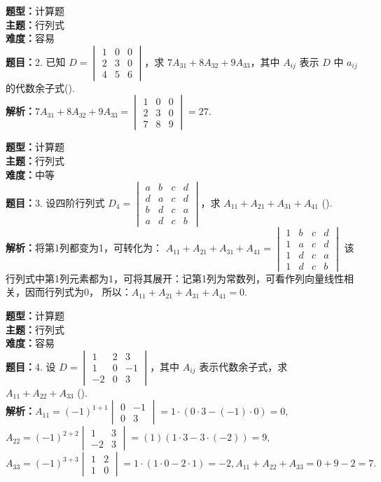 \documentclass{ctexart}
\newenvironment{question}[5]{%
	\noindent\textbf{题型：}#1\\
	\textbf{主题：}#2\\
	\textbf{难度：}#3\\
	\textbf{题目：}#4\\
	\textbf{解析：}#5\\
	\vspace{1em}
}{}
\begin{document}
	
	\begin{question}
		{计算题}
		{行列式}
		{容易}
		{2. 已知 \(D=\begin{vmatrix}1 & 0 & 0 \\ 2 & 3 & 0 \\ 4 & 5 & 6\end{vmatrix}\)，求 \(7 A_{31} + 8 A_{32} + 9 A_{33}\)，其中 \(A_{ij}\) 表示 \(D\) 中 \(a_{ij}\) 的代数余子式(\qquad). }
		{\(7 A_{31} + 8 A_{32} + 9 A_{33} = \begin{vmatrix}1 & 0 & 0 \\ 2 & 3 & 0 \\ 7 & 8 & 9\end{vmatrix} = 27\). }
	\end{question}
	
	
	\begin{question}
		{计算题}
		{行列式}
		{中等}
		{3. 设四阶行列式 \(D_4=\begin{vmatrix}a & b & c & d \\ d & a & c & d \\ b & d & c & a \\ a & d & c & b\end{vmatrix}\)，求 \(A_{11} + A_{21} + A_{31} + A_{41}\) (\qquad). }
		{将第1列都变为1，可转化为：
			\(
			A_{11} + A_{21} + A_{31} + A_{41} = \begin{vmatrix}1 & b & c & d \\ 1 & a & c & d \\ 1 & d & c & a \\ 1 & d & c & b\end{vmatrix} 
			\)
			该行列式中第1列元素都为1，可将其展开：记第1列为常数列，可看作列向量线性相关，因而行列式为0，
			所以：\(A_{11} + A_{21} + A_{31} + A_{41} = 0\). }
	\end{question}
	
	\begin{question}
		{计算题}
		{行列式}
		{容易}
		{4. 设 \(D=\begin{vmatrix}1 & 2 & 3 \\ 1 & 0 & -1 \\ -2 & 0 & 3\end{vmatrix}\)，其中 \(A_{ij}\) 表示代数余子式，求 \(A_{11}+A_{22}+A_{33}\) (\qquad). }
		{\(A_{11} = (-1)^{1+1} \begin{vmatrix}0 & -1 \\ 0 & 3\end{vmatrix} = 1 \cdot (0 \cdot 3 - (-1)\cdot 0) = 0, \) \(A_{22} = (-1)^{2+2} \begin{vmatrix}1 & 3 \\ -2 & 3\end{vmatrix} = (1)(1 \cdot 3 - 3 \cdot (-2)) = 9, \) \(A_{33} = (-1)^{3+3} \begin{vmatrix}1 & 2 \\ 1 & 0\end{vmatrix} = 1 \cdot (1 \cdot 0 - 2 \cdot 1) = -2, A_{11} + A_{22} + A_{33} = 0 + 9 - 2 = 7.\)}
	\end{question}
	
\end{document}
